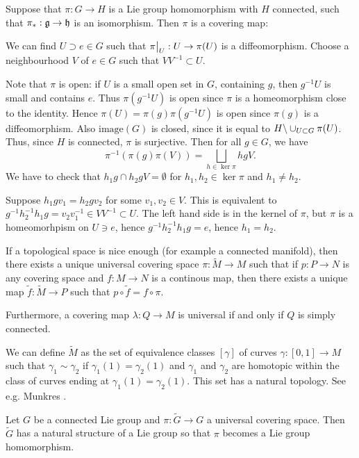 \documentclass[11pt, english]{article}
\begin{document}
\begin{example}
\label{excovering}
 Suppose that $\pi:G \to H$ is a Lie group homomorphism with $H$ connected, such that $\pi_\ast: \mathfrak g \to \mathfrak h$ is an isomorphism. Then $\pi$ is a covering map:

We can find $U \supset e \in G$ such that $\restr{\pi}{U}:U \to \pi(U)$ is a diffeomorphism. Choose a neighbourhood $V$ of $e \in G$ such that $VV^{-1} \subset U$. 

Note that $\pi$ is open: if $U$ is a small open set in $G$, containing $g$, then $g^{-1}U$ is small and contains $e$. Thus $\pi(g^{-1}U)$ is open since $\pi$ is a homeomorphism close to the identity. Hence $\pi(U)=\pi(g) \pi(g^{-1}U)$ is open since $\pi(g)$ is a diffeomorphism. Also $\mathrm{image}(G)$ is closed, since it is equal to
$H \backslash \cup_{U \subset G} \pi(U)$. Thus, since $H$ is connected, $\pi$ is surjective. Then for all $g \in G$, we have
$$
\pi^{-1}(\pi(g) \pi(V)) = \bigsqcup_{h \in \ker \pi} hg V.
$$
We have to check that $h_1g \cap h_2gV = \emptyset$ for $h_1,h_2 \in \ker \pi$ and $h_1 \neq h_2$. 

Suppose $h_1gv_1 = h_2gv_2$ for some $v_1,v_2 \in V$. This is equivalent to $g^{-1}h_2^{-1}h_1g = v_2v_1^{-1} \in VV^{-1} \subset U$. The left hand side is in the kernel of $\pi$, but $\pi$ is a homeomorhpism on $U \ni e$, hence $g^{-1}h_2^{-1}h_1 g = e$, hence $h_1= h_2$. 
\end{example}

If a topological space is nice enough (for example a connected manifold), then there exists a unique universal covering space $\pi:\widetilde M \to M$ such that if $p:P \to N$ is any covering space and $f:M \to N$ is a continous map, then there exists a unique map $\widetilde f: \widetilde M \to P$ such that $p \circ \widetilde f = f \circ \pi$.

Furthermore, a covering map $\lambda: Q \to M$ is universal if and only if $Q$ is simply connected. 

We can define $\widetilde M$ as the set of equivalence classes $[\gamma]$ of curves $\gamma:[0,1] \to M$ such that $\gamma_1 \sim \gamma_2$  if $\gamma_1(1)=\gamma_2(1)$ and $\gamma_1$ and $\gamma_2$ are homotopic within the class of  curves ending at $\gamma_1(1)=\gamma_2(1)$. This set has a natural topology. See e.g. Munkres \cite{hatcher_algtop}.

\begin{prop}
Let $G$ be a connected Lie group and $\pi: \widetilde G \to G$ a universal covering space. Then $\widetilde G$ has a natural structure of a Lie group so that $\pi$ becomes a Lie group homomorphism.
\end{prop}
\end{document}
